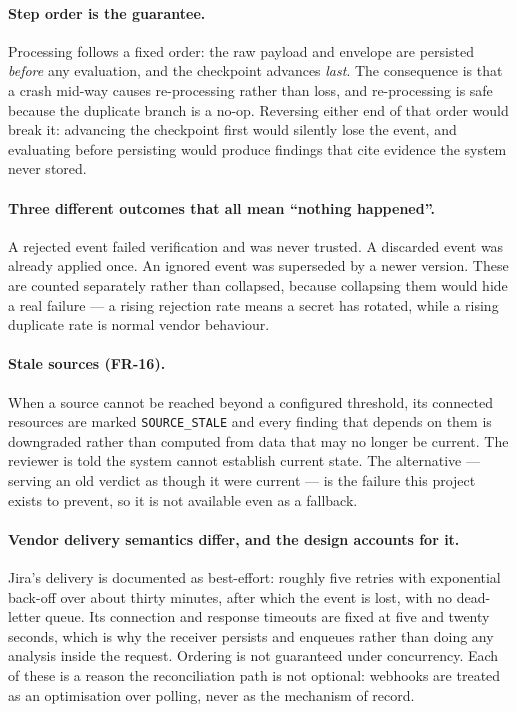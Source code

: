 \paragraph{Step order is the guarantee.} Processing follows a fixed order: the
raw payload and envelope are persisted \emph{before} any evaluation, and the
checkpoint advances \emph{last}. The consequence is that a crash mid-way causes
re-processing rather than loss, and re-processing is safe because the duplicate
branch is a no-op. Reversing either end of that order would break it: advancing
the checkpoint first would silently lose the event, and evaluating before
persisting would produce findings that cite evidence the system never stored.

\paragraph{Three different outcomes that all mean ``nothing happened''.} A
rejected event failed verification and was never trusted. A discarded event was
already applied once. An ignored event was superseded by a newer version. These
are counted separately rather than collapsed, because collapsing them would
hide a real failure --- a rising rejection rate means a secret has rotated,
while a rising duplicate rate is normal vendor behaviour.

\paragraph{Stale sources (FR-16).} When a source cannot be reached beyond a
configured threshold, its connected resources are marked
\texttt{SOURCE\_\allowbreak{}STALE} and every finding that depends on them is
downgraded rather than computed from data that may no longer be current. The
reviewer is told the system cannot establish current state. The alternative ---
serving an old verdict as though it were current --- is the failure this
project exists to prevent, so it is not available even as a fallback.

\paragraph{Vendor delivery semantics differ, and the design accounts for it.}
Jira's delivery is documented as best-effort: roughly five retries with
exponential back-off over about thirty minutes, after which the event is lost,
with no dead-letter queue. Its connection and response timeouts are fixed at
five and twenty seconds, which is why the receiver persists and enqueues rather
than doing any analysis inside the request. Ordering is not guaranteed under
concurrency. Each of these is a reason the reconciliation path is not optional:
webhooks are treated as an optimisation over polling, never as the mechanism of
record.

